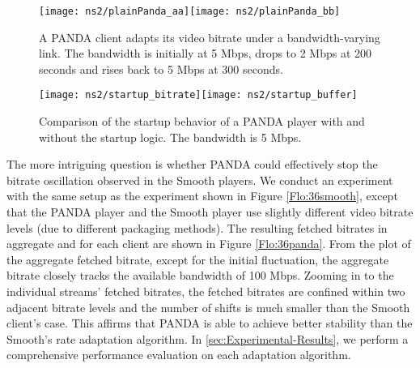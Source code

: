 \documentclass[conference]{IEEEtran}
\theoremstyle{plain}
\theoremstyle{definition}
\theoremstyle{plain}
\theoremstyle{plain}
\begin{document}
\begin{figure}
\begin{centering}
\texttt{[image: ns2/plainPanda\_aa]}\texttt{[image: ns2/plainPanda\_bb]}
\vspace{-0.23in}

\par\end{centering}

\caption{A PANDA client adapts its video bitrate under a bandwidth-varying
link. The bandwidth is initially at 5 Mbps, drops to 2 Mbps at 200
seconds and rises back to 5 Mbps at 300 seconds. }


\label{Flo:plainPANDA} \vspace{-0.05in}
\end{figure}


\begin{figure}
\begin{centering}
\texttt{[image: ns2/startup\_bitrate]}\texttt{[image: ns2/startup\_buffer]}
\vspace{-0.23in}

\par\end{centering}

\caption{Comparison of the startup behavior of a PANDA player with and without
the startup logic. The bandwidth is 5 Mbps.}


\label{Flo:startup} \vspace{-0.05in}
\end{figure}
The more intriguing question is whether PANDA could effectively stop
the bitrate oscillation observed in the Smooth players. We conduct
an experiment with the same setup as the experiment shown in Figure
\ref{Flo:36smooth}, except that the PANDA player and the Smooth player
use slightly different video bitrate levels (due to different packaging
methods). The resulting fetched bitrates in aggregate and for each
client are shown in Figure \ref{Flo:36panda}. From the plot of the
aggregate fetched bitrate, except for the initial fluctuation, the
aggregate bitrate closely tracks the available bandwidth of 100 Mbps.
Zooming in to the individual streams' fetched bitrates, the fetched
bitrates are confined within two adjacent bitrate levels and the number
of shifts is much smaller than the Smooth client's case. This affirms
that PANDA is able to achieve better stability than the Smooth's rate
adaptation algorithm. In \ref{sec:Experimental-Results}, we
perform a comprehensive performance evaluation on each adaptation
algorithm.
\end{document}
